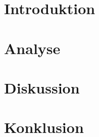 
\usepackage[disable]{todonotes}					%
\usepackage[draft]{fixme}


	
	\clearpage
	\newpage\null\thispagestyle{empty}
	
	\addtocounter{page}{4}
	
	\newpage\null\thispagestyle{empty}\newpage
	\label{startoftoc}
	\begin{KeepFromToc}
		\tableofcontents
		\newpage\null\thispagestyle{empty}\newpage
		\todototoc
		\listoftodos
	\end{KeepFromToc}
	\label{endoftoc}
	
	\chapter{Introduktion}
	\chapter{Analyse}
	
	
	
	\chapter{Diskussion}
	\chapter{Konklusion}
	
	
	
	\label{lastpagewithoutappendix}

	\appendix
	\cleardoublepage

